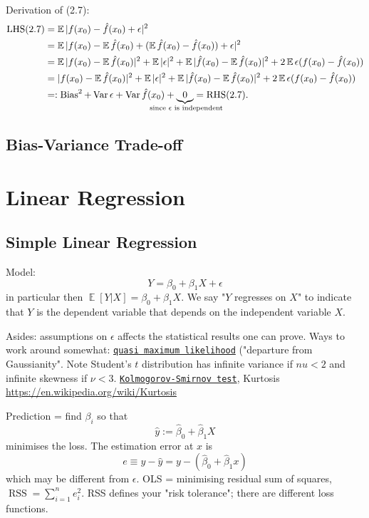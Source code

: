 \documentclass[11pt]{article}
\theoremstyle{definition}
\newcommand{\Var}{\operatorname{Var}}
\newcommand{\E}{\operatorname{\mathbb E}}
\newcommand{\Bias}{\operatorname{Bias}}
\newcommand{\RSS}{\operatorname{RSS}}
\newcommand{\myhref}[2]{\href{#1}{\texttt{#2}}}
\begin{document}
Derivation of (2.7): 
\begin{align*}
\operatorname{LHS}(2.7)
&=  \E|f(x_0) - \hat f(x_0) + \epsilon|^2 \\
&= \E|f(x_0) - \E \hat f(x_0) + (\E \hat f(x_0) - \hat f(x_0)) + \epsilon|^2 \\
&= \E|f(x_0) - \E\hat f(x_0)|^2 + \E|\epsilon|^2 + \E|\hat f(x_0) - \E\hat f(x_0)|^2 + 2\E\epsilon (f(x_0) - \hat f(x_0) ) \\
&= | f(x_0) - \E\hat f(x_0)|^2 + \E|\epsilon|^2 + \E|\hat f(x_0) - \E\hat f(x_0)|^2 + 2\E\epsilon (f(x_0) - \hat f(x_0) ) \\
&=: \Bias^2 + \Var\epsilon + \Var\hat f(x_0) + \underbrace{0}_{ \mathclap{\text{ since }\epsilon\text{ is independent}}} = \operatorname{RHS}(2.7).
\end{align*}

\subsection{Bias-Variance Trade-off}


\section{Linear Regression}
\subsection{Simple Linear Regression}
Model:
\[ Y = \beta_0 + \beta_1 X + \epsilon\]
in particular then \(\E [Y|X]  = \beta_0 + \beta_1 X\). We say "$Y$ regresses on $X$" to indicate that $Y$ is the dependent variable that depends on the independent variable $X$.

Asides: assumptions on $\epsilon$ affects the statistical results one can prove. Ways to work around somewhat: \myhref{https://en.wikipedia.org/wiki/Quasi-maximum_likelihood_estimate}{quasi maximum likelihood} ("departure from Gaussianity". Note Student's $t$ distribution has infinite variance if $nu<2$ and infinite  skewness if $\nu<3$. \myhref{https://en.wikipedia.org/wiki/Kolmogorov–Smirnov_test}{Kolmogorov-Smirnov test}, Kurtosis \url{https://en.wikipedia.org/wiki/Kurtosis}

Prediction = find $\beta_i$ so that 
\[ \hat y := \hat\beta_0 + \hat\beta_1 X\]
minimises the loss. The estimation error at \(x\) is
\[ e \equiv y - \hat y = y - (\hat\beta_0 + \hat\beta_1 x)\]
which may be different from $\epsilon$. OLS = minimising residual sum of squares, \(\RSS = \sum_{i=1}^n e_i^2\). RSS defines your "risk tolerance"; there are different loss functions.
\end{document}
